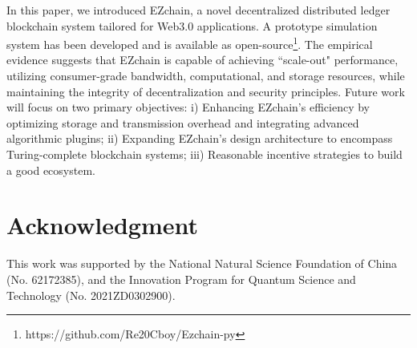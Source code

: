 \documentclass[conference]{IEEEtran}
\begin{document}
In this paper, we introduced EZchain, a novel decentralized distributed ledger blockchain system tailored for Web3.0 applications. A prototype simulation system has been developed and is available as open-source\footnote{https://github.com/Re20Cboy/Ezchain-py}. The empirical evidence suggests that EZchain is capable of achieving ``scale-out" performance, utilizing consumer-grade bandwidth, computational, and storage resources, while maintaining the integrity of decentralization and security principles. Future work will focus on two primary objectives: i) Enhancing EZchain's efficiency by optimizing storage and transmission overhead and integrating advanced algorithmic plugins; ii) Expanding EZchain's design architecture to encompass Turing-complete blockchain systems; iii) Reasonable incentive strategies to build a good ecosystem.


\section*{Acknowledgment}
This work was supported by the National Natural Science Foundation of China (No. 62172385), and the Innovation Program for Quantum Science and Technology (No. 2021ZD0302900).

\newpage

\end{document}
